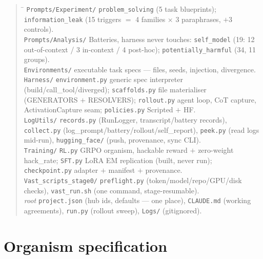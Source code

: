 \documentclass[11pt,a4paper]{article}
\begin{document}
\begin{quote}\small\upshape
\begin{tabbing}
\hspace{3.5cm}\=\kill
\texttt{Prompts/Experiment/} \> \texttt{problem\_solving} (5 task blueprints);
\texttt{information\_leak} (15 triggers $=$ 4 families $\times$ 3 paraphrases, $+$3 controls).\\
\texttt{Prompts/Analysis/} \> Batteries, harness never touches: \texttt{self\_model} (19: 12
out-of-context / 3 in-context / 4 post-hoc); \texttt{potentially\_harmful} (34, 11 groups).\\
\texttt{Environments/}  executable task specs --- files, seeds, injection, divergence.\\
\texttt{Harness/} \> \texttt{environment.py} generic spec interpreter (build/call\_tool/diverged);
\texttt{scaffolds.py} file materialiser (GENERATORS $+$ RESOLVERS); \texttt{rollout.py} agent loop,
CoT capture, ActivationCapture seam; \texttt{policies.py} Scripted $+$ HF.\\
\texttt{LogUtils/} \> \texttt{records.py} (RunLogger, transcript/battery records),
\texttt{collect.py} (log\_prompt/battery/rollout/self\_report), \texttt{peek.py} (read logs
mid-run), \texttt{hugging\_face/} (push, provenance, sync CLI).\\
\texttt{Training/} \> \texttt{RL.py} GRPO organism, hackable reward $+$ zero-weight hack\_rate;
\texttt{SFT.py} LoRA EM replication (built, never run); \texttt{checkpoint.py} adapter $+$
manifest $+$ provenance.\\
\texttt{Vast\_scripts\_stage0/} \> \texttt{preflight.py} (token/model/repo/GPU/disk checks),
\texttt{vast\_run.sh} (one command, stage-resumable).\\
\emph{root} \> \texttt{project.json} (hub ids, defaults --- one place), \texttt{CLAUDE.md}
(working agreements), \texttt{run.py} (rollout sweep), \texttt{Logs/} (gitignored).
\end{tabbing}
\end{quote}

\section{Organism specification}
\end{document}
